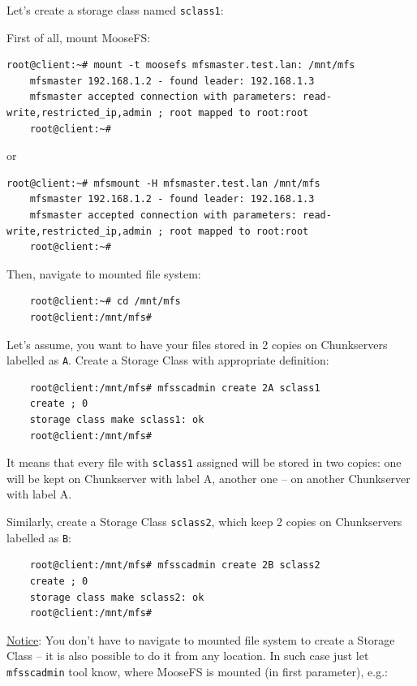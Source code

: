 \documentclass[a4paper,11pt,english]{report}
\def\code#1{\texttt{#1}}
\begin{document}
			Let's create a storage class named \code{sclass1}:
			
			First of all, mount MooseFS:
			
			\begin{lstlisting}[caption={Mounting MooseFS (Linux only)}]
	root@client:~# mount -t moosefs mfsmaster.test.lan: /mnt/mfs
	mfsmaster 192.168.1.2 - found leader: 192.168.1.3
	mfsmaster accepted connection with parameters: read-write,restricted_ip,admin ; root mapped to root:root
	root@client:~#
			\end{lstlisting}
			
			or
			
			\begin{lstlisting}[caption={Mounting MooseFS (universal)}]
	root@client:~# mfsmount -H mfsmaster.test.lan /mnt/mfs
	mfsmaster 192.168.1.2 - found leader: 192.168.1.3
	mfsmaster accepted connection with parameters: read-write,restricted_ip,admin ; root mapped to root:root
	root@client:~#
			\end{lstlisting}
			
			Then, navigate to mounted file system:
			\begin{lstlisting}
	root@client:~# cd /mnt/mfs
	root@client:/mnt/mfs#
			\end{lstlisting}
			
			Let's assume, you want to have your files stored in 2 copies on Chunkservers labelled as \code{A}. Create a Storage Class with appropriate definition:
			
			\begin{lstlisting}
	root@client:/mnt/mfs# mfsscadmin create 2A sclass1
	create ; 0
	storage class make sclass1: ok
	root@client:/mnt/mfs#
			\end{lstlisting}
			
			It means that every file with \code{sclass1} assigned will be stored in two copies: one will be kept on Chunkserver with label A, another one -- on another Chunkserver with label A.
			
			Similarly, create a Storage Class \code{sclass2}, which keep 2 copies on Chunkservers labelled as \code{B}:
			
			\begin{lstlisting}
	root@client:/mnt/mfs# mfsscadmin create 2B sclass2
	create ; 0
	storage class make sclass2: ok
	root@client:/mnt/mfs#
			\end{lstlisting}
			
			\underline{Notice}: You don't have to navigate to mounted file system to create a Storage Class -- it is also possible to do it from any location. In such case just let \code{mfsscadmin} tool know, where MooseFS is mounted (in first parameter), e.g.:
			
\end{document}
